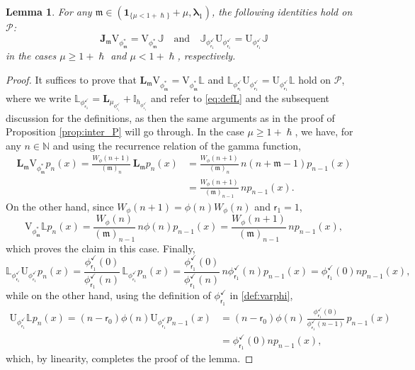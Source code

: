 \documentclass[10pt]{amsart}
\theoremstyle{plain}
\newtheorem{lemma}[theorem]{Lemma}
\theoremstyle{definition}
\newcommand{\N}{\mathbb{N}}
\newcommand{\Poly}{\mathscr{P}}
\newcommand{\calI}{\mathds{I}}
\newcommand{\calL}{\mathds{L}}
\newcommand{\calLd}{\mathbf{L}}
\newcommand{\calJ}{\mathds{J}}
\newcommand{\calJd}{\mathbf{J}}
\newcommand{\m}{\mathfrak{m}}
\newcommand{\lam}{{\bm{\lambda}_1}}
\newcommand{\tet}{{\mathsf{r}_0}}
\newcommand{\vat}{{\mathsf{r}_1}}
\newcommand{\phm}{{\phi_\m^*}}
\renewcommand{\varphi}{{\phi_{\vat}^{\checkmark}}}
\let\h\hslash
\let\mo\mu
\begin{document}
\begin{lemma}
\label{prop:inter_P-2}
For any $\m \in (\bm{1}_{\{\mo < 1+\h\}}+\mo,\lam)$, the following identities hold on $\Poly$:
\begin{equation*}%
\calJd_\m {\mathrm{V}}_{\phm} = \mathrm{V}_{\phm}\calJ \quad \text{and} \quad \calJ_\varphi \mathrm{U}_\varphi = \mathrm{U}_\varphi \calJ
\end{equation*}
in the cases $\mo \geq 1+\h$ and $\mo < 1+\h$, respectively.
\end{lemma}

\begin{proof}
It suffices to prove that $\calLd_\m {\mathrm{V}}_{\phm} = {\mathrm{V}}_{\phm} \calL$ and $\calL_\varphi \mathrm{U}_\varphi = \mathrm{U}_\varphi \calL$ hold on $\Poly$, where we write $\calL_\varphi = \calLd_{\mo_\varphi} +\calI_{h_\varphi}$ and refer to \eqref{eq:defL} and the subsequent discussion for the definitions, as then the same arguments as in the proof of Proposition \ref{prop:inter_P} will go through. In the case $\mo \geq 1+\h$, we have, for any $n\in \N$ and using the recurrence relation of the gamma function,
\begin{align*}
\calLd_\m {\mathrm{V}}_{\phm}p_n(x) = \frac{W_{\phi}(n+1)}{(\m)_n}\,\calLd_\m p_n(x) &= \frac{W_{\phi}(n+1)}{(\m)_n}\,n(n+\m-1) p_{n-1}(x)\\
& = \frac{W_{\phi}(n+1)}{(\m)_{n-1}}\, n p_{n-1}(x).
\end{align*}
On the other hand, since $W_\phi(n+1)=\phi(n)W_\phi(n)$ and $\vat = 1$,
\begin{equation*}
{\mathrm{V}}_{\phm}\calL p_n(x) = \frac{W_{\phi}(n)}{(\m)_{n-1}}\, n\phi(n) p_{n-1}(x)
= \frac{W_{\phi}(n+1)}{(\m)_{n-1}}\, n p_{n-1}(x),
\end{equation*}
which proves the claim in this case. Finally,
\begin{equation*}
\calL_\varphi \mathrm{U}_\varphi p_n(x) = \frac{\varphi(0)}{\varphi(n)}\, \calL_\varphi p_n(x)= \frac{\varphi(0)}{\varphi(n)}\, n\varphi(n) p_{n-1}(x) = \varphi(0)np_{n-1}(x),
\end{equation*}
while on the other hand, using the definition of $\varphi$ in \eqref{def:varphi},
\begin{align*}
\mathrm{U}_\varphi \calL p_n(x) = (n-\tet)\phi(n) \mathrm{U}_\varphi	p_{n-1}(x) &= (n-\tet)\phi(n)\, \frac{\varphi(0)}{\varphi(n-1)}\, p_{n-1}(x)\\
&= \varphi(0) np_{n-1}(x),
\end{align*}
which, by linearity, completes the proof of the lemma.
\end{proof}
\end{document}
